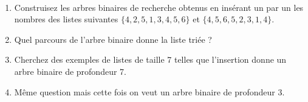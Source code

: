 \documentclass{../cours}
\begin{document}
\begin{exercice}

~
\begin{enumerate}
\item Construisez les arbres binaires de recherche obtenus en insérant un par un les nombres des listes suivantes $\lbrace 4, 2, 5, 1, 3, 4, 5, 6 \rbrace$ et $\lbrace 4, 5, 6, 5, 2, 3, 1, 4 \rbrace$.

\item Quel parcours de l'arbre binaire donne la liste triée ? 

\item Cherchez des exemples de listes de taille 7 telles que l'insertion donne un arbre binaire de profondeur 7.

\item Même question mais cette fois on veut un arbre binaire de profondeur $3$.
\end{enumerate}
\end{exercice}
\end{document}
